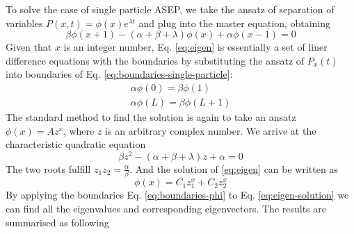 \documentclass[12pt,a4paper]{article}
\begin{document}
To solve the case of single particle ASEP, we take the ansatz of separation of
variables $P(x,t) = \phi(x)e^{\lambda t}$ and plug into the master equation,
obtaining 
\begin{equation}
    \label{eq:eigen}
    \beta\phi(x+1) -(\alpha+\beta+\lambda)\phi(x) + \alpha\phi(x-1) = 0
\end{equation}
Given that $x$ is an integer number, Eq. \eqref{eq:eigen} is essentially a set
of liner difference equations with the boundaries by substituting the ansatz of
$P_x(t)$ into boundaries of Eq. \eqref{eq:boundaries-single-particle}: 
\begin{subequations}
    \label{eq:boundaries-phi}
\begin{eqnarray}
    \alpha\phi(0) = \beta\phi(1) \\
    \alpha \phi(L) = \beta \phi(L+1)
\end{eqnarray}
\end{subequations}
The standard method to find the solution is again to take an ansatz $\phi(x) =
Az^x$, where $z$ is an arbitrary complex number. We arrive at the characteristic
quadratic equation 
\begin{equation}
    \label{eq:characteristic}
    \beta z^2 - (\alpha + \beta + \lambda ) z + \alpha = 0
\end{equation}
The two roots fulfill $z_1z_2 = \frac{\alpha}{\beta}$. And the solution of
\eqref{eq:eigen} can be written as 
\begin{equation}
    \label{eq:eigen-solution}
    \phi(x) = C_1 z_1^x + C_2 z_2^x
\end{equation}
By applying the boundaries Eq. \eqref{eq:boundaries-phi} to Eq.
\eqref{eq:eigen-solution} we can find all the eigenvalues and corresponding
eigenvectors. The results are summarised as following
\end{document}
